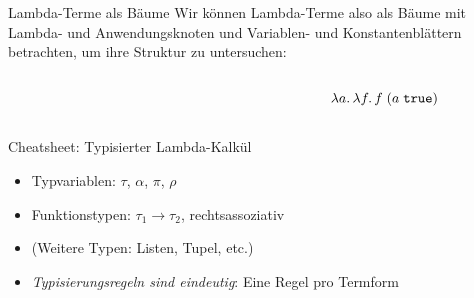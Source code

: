 \documentclass{beamer}
\begin{document}
\begin{frame}{Lambda-Terme als Bäume}
  Wir können Lambda-Terme also als Bäume mit Lambda- und Anwendungsknoten und Variablen- und Konstantenblättern betrachten, um ihre Struktur zu untersuchen:

  \begin{columns}
    \begin{column}{0.5\textwidth}
      \begin{figure}
      \end{figure}
    \end{column}
    \begin{column}{0.35\textwidth}
      \begin{equation*}
        \lambda a.\, \lambda f.\, f\;(a\;\texttt{true})
      \end{equation*}
    \end{column}
  \end{columns}
\end{frame}

\begin{frame}{Cheatsheet: Typisierter Lambda-Kalkül}

  \begin{itemize}
    \item Typvariablen: $\tau$, $\alpha$, $\pi$, $\rho$
    \item Funktionstypen: $\tau_1 \to \tau_2$, rechtsassoziativ
    \item (Weitere Typen: Listen, Tupel, etc.)
    \item \emph{Typisierungsregeln sind eindeutig}: Eine Regel pro Termform
  \end{itemize}
\end{frame}
\end{document}

